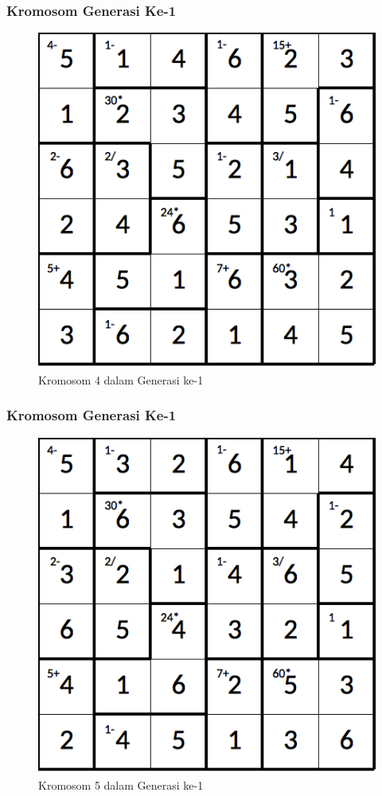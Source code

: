 \documentclass{beamer}
\begin{document}
\begin{frame}
\frametitle{Kromosom Generasi Ke-1}
\begin{figure}
\centering
\captionsetup{justification=centering}
\includegraphics[scale=0.333]{Gambar/hybridgenetic/Generation1Chromosome4}
\caption[Kromosom 4 dalam Generasi ke-1]{Kromosom 4 dalam Generasi ke-1}
\label{fig:analisisg1k4}
\end{figure}
\end{frame}

\note{

}

\begin{frame}
\frametitle{Kromosom Generasi Ke-1}
\begin{figure}
\centering
\captionsetup{justification=centering}
\includegraphics[scale=0.333]{Gambar/hybridgenetic/Generation1Chromosome5}
\caption[Kromosom 5 dalam Generasi ke-1]{Kromosom 5 dalam Generasi ke-1}
\label{fig:analisisg1k5}
\end{figure}
\end{frame}
\end{document}
